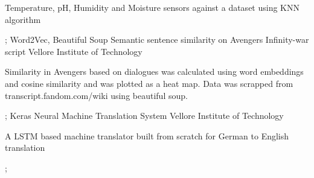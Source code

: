 \documentclass[11pt, a4paper]{awesome-cv}
\begin{document}
\begin{cventries}
{\begin{cvitems}
{Temperature, pH, Humidity and Moisture sensors against a dataset using KNN algorithm}
      \end{cvitems}
    }
    \newline;
    \cventry
    {Word2Vec, Beautiful Soup} %
    {Semantic sentence similarity on Avengers Infinity-war script} %
    {Vellore Institute of Technology} %
    {} %
    {
      \begin{cvitems} %
        \item {Similarity in Avengers based on dialogues was calculated using word embeddings and cosine similarity and was plotted as a heat map. Data was scrapped from transcript.fandom.com/wiki using beautiful soup.}
      \end{cvitems}
    }
    \newline;
    \cventry
    {Keras} %
    {Neural Machine Translation System} %
    {Vellore Institute of Technology} %
    {} %
    {
      \begin{cvitems} %
        \item {A LSTM based machine translator built from scratch for German to English translation}
      \end{cvitems}
    }
    \newline;
\end{cventries}

\end{document}
